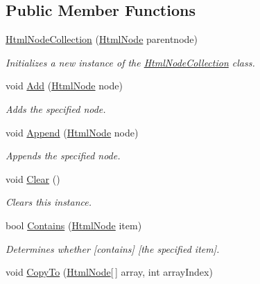 \subsection*{Public Member Functions}
\begin{DoxyCompactItemize}
\item 
\hyperlink{class_html_agility_pack_1_1_html_node_collection_a3b0736683185fe0aad9b71478da4ba3d}{Html\+Node\+Collection} (\hyperlink{class_html_agility_pack_1_1_html_node}{Html\+Node} parentnode)
\begin{DoxyCompactList}\small\item\em Initializes a new instance of the \hyperlink{class_html_agility_pack_1_1_html_node_collection}{Html\+Node\+Collection} class. \end{DoxyCompactList}\item 
void \hyperlink{class_html_agility_pack_1_1_html_node_collection_ada50933ca3a4685d273916c36798e0d7}{Add} (\hyperlink{class_html_agility_pack_1_1_html_node}{Html\+Node} node)
\begin{DoxyCompactList}\small\item\em Adds the specified node. \end{DoxyCompactList}\item 
void \hyperlink{class_html_agility_pack_1_1_html_node_collection_abc00c699fdf6abea58f5eca683fd1465}{Append} (\hyperlink{class_html_agility_pack_1_1_html_node}{Html\+Node} node)
\begin{DoxyCompactList}\small\item\em Appends the specified node. \end{DoxyCompactList}\item 
void \hyperlink{class_html_agility_pack_1_1_html_node_collection_a2b51957914a0ef7b394f28df64367151}{Clear} ()
\begin{DoxyCompactList}\small\item\em Clears this instance. \end{DoxyCompactList}\item 
bool \hyperlink{class_html_agility_pack_1_1_html_node_collection_acc3db502d0905dd71ab9ede99aa7e097}{Contains} (\hyperlink{class_html_agility_pack_1_1_html_node}{Html\+Node} item)
\begin{DoxyCompactList}\small\item\em Determines whether \mbox{[}contains\mbox{]} \mbox{[}the specified item\mbox{]}. \end{DoxyCompactList}\item 
void \hyperlink{class_html_agility_pack_1_1_html_node_collection_a88a914ed380705b93c9e600796442902}{Copy\+To} (\hyperlink{class_html_agility_pack_1_1_html_node}{Html\+Node}\mbox{[}$\,$\mbox{]} array, int array\+Index)

\end{DoxyCompactItemize}
